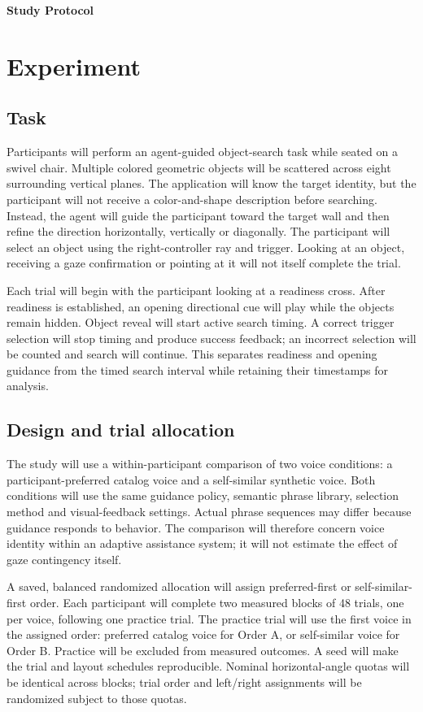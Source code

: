 \documentclass[11pt,letterpaper]{article}
\begin{document}
{\LARGE\bfseries Study Protocol}\par
\section{Experiment}
\subsection{Task}
Participants will perform an agent-guided object-search task while seated on a swivel chair. Multiple colored geometric objects will be scattered across eight surrounding vertical planes. The application will know the target identity, but the participant will not receive a color-and-shape description before searching. Instead, the agent will guide the participant toward the target wall and then refine the direction horizontally, vertically or diagonally. The participant will select an object using the right-controller ray and trigger. Looking at an object, receiving a gaze confirmation or pointing at it will not itself complete the trial.

Each trial will begin with the participant looking at a readiness cross. After readiness is established, an opening directional cue will play while the objects remain hidden. Object reveal will start active search timing. A correct trigger selection will stop timing and produce success feedback; an incorrect selection will be counted and search will continue. This separates readiness and opening guidance from the timed search interval while retaining their timestamps for analysis.

\subsection{Design and trial allocation}
The study will use a within-participant comparison of two voice conditions: a participant-preferred catalog voice and a self-similar synthetic voice. Both conditions will use the same guidance policy, semantic phrase library, selection method and visual-feedback settings. Actual phrase sequences may differ because guidance responds to behavior. The comparison will therefore concern voice identity within an adaptive assistance system; it will not estimate the effect of gaze contingency itself.

A saved, balanced randomized allocation will assign preferred-first or self-similar-first order. Each participant will complete two measured blocks of 48 trials, one per voice, following one practice trial. The practice trial will use the first voice in the assigned order: preferred catalog voice for Order A, or self-similar voice for Order B. Practice will be excluded from measured outcomes. A seed will make the trial and layout schedules reproducible. Nominal horizontal-angle quotas will be identical across blocks; trial order and left/right assignments will be randomized subject to those quotas.
\end{document}
